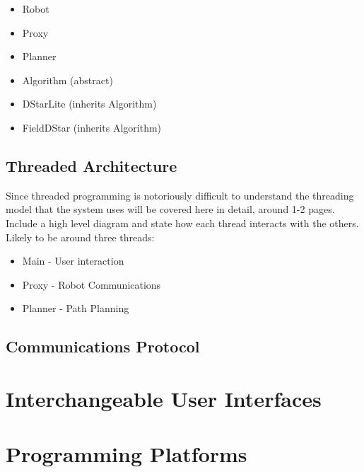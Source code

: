 \begin{itemize}
\item Robot
\item Proxy
\item Planner
\item Algorithm (abstract)
\item DStarLite (inherits Algorithm)
\item FieldDStar (inherits Algorithm)
\end{itemize} 

\subsection{Threaded Architecture}

\noindent
Since threaded programming is notoriously difficult to understand the threading model that the system uses will be covered here in detail, around 1-2 pages. Include a high level diagram and state how each thread interacts with the others. Likely to be around three threads:

\begin{itemize}
\item Main - User interaction
\item Proxy - Robot Communications
\item Planner - Path Planning
\end{itemize} 

\newpage

\subsection{Communications Protocol}

\newpage


\section{Interchangeable User Interfaces}

\newpage


\section{Programming Platforms}

